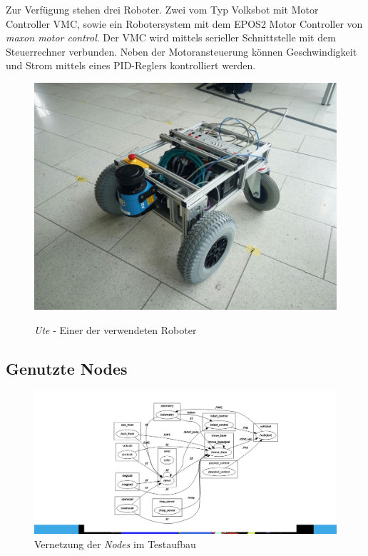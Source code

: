 \documentclass[11pt,a4paper]{article}
\begin{document}
{Zur Verf\"ugung stehen drei Roboter. Zwei vom Typ Volksbot mit Motor Controller VMC, sowie ein Robotersystem mit dem EPOS2 Motor Controller von \textit{maxon motor control}. Der VMC \cite{Volksbot} wird mittels serieller Schnittstelle mit dem Steuerrechner verbunden. Neben der Motoransteuerung können Geschwindigkeit und Strom mittels eines PID-Reglers kontrolliert werden. 
  

\begin{figure}[h]
	\centering
	{\includegraphics[trim= 2cm 2cm 2cm 2cm, clip=true,width=\linewidth]{pictures/robot.jpg}}
	\caption{\textit{Ute} - Einer der verwendeten Roboter}
\end{figure}


\subsection{Genutzte Nodes}
{
	
	
	\begin{figure}[h]
		\includegraphics[trim=9cm 1cm 7cm 1cm , clip= true,width=\textwidth]{pictures/node_graph.png}
		\caption{Vernetzung der \textit{Nodes} im Testaufbau}
	\end{figure}
	
}}
\end{document}
